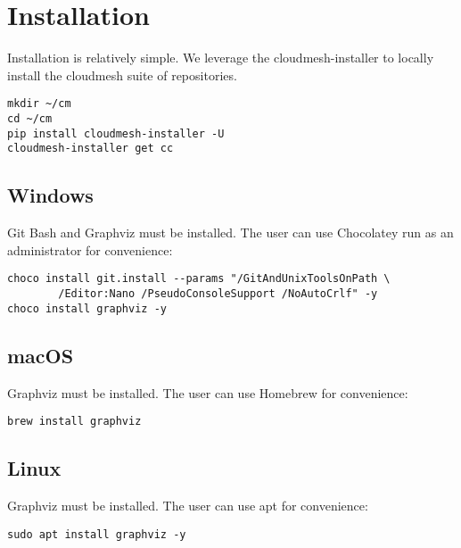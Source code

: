 
\section{Installation}\label{installation}

Installation is relatively simple. We leverage the cloudmesh-installer
to locally install the cloudmesh suite of repositories.

\begin{verbatim}
mkdir ~/cm
cd ~/cm
pip install cloudmesh-installer -U
cloudmesh-installer get cc
\end{verbatim}

\subsection{Windows}\label{windows}

Git Bash and Graphviz must be installed. The user can use Chocolatey run
as an administrator for convenience:

\begin{verbatim}
choco install git.install --params "/GitAndUnixToolsOnPath \
        /Editor:Nano /PseudoConsoleSupport /NoAutoCrlf" -y
choco install graphviz -y
\end{verbatim}

\subsection{macOS}\label{macos}

Graphviz must be installed. The user can use Homebrew for convenience:

\begin{verbatim}
brew install graphviz
\end{verbatim}

\hypertarget{linux}{%
\subsection{Linux}\label{linux}}

Graphviz must be installed. The user can use apt for convenience:

\begin{verbatim}
sudo apt install graphviz -y
\end{verbatim}

